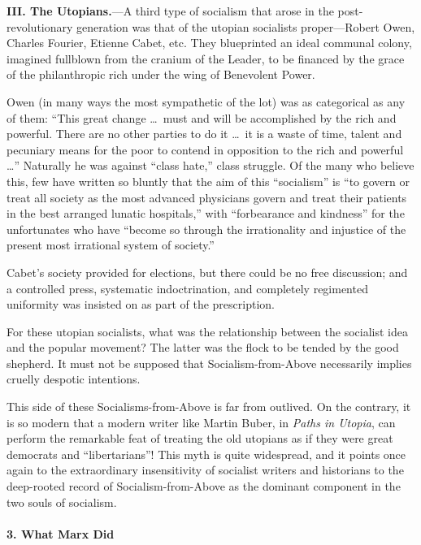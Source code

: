 \textbf{III. The Utopians.}---A third type of socialism that arose in the post-revolutionary generation was that of the utopian socialists proper---Robert Owen, Charles Fourier, Etienne Cabet, etc. They blueprinted an ideal communal colony, imagined fullblown from the cranium of the Leader, to be financed by the grace of the philanthropic rich under the wing of Benevolent Power.

Owen (in many ways the most sympathetic of the lot) was as categorical as any of them: ``This great change \ldots\ must and will be accomplished by the rich and powerful. There are no other parties to do it \ldots\ it is a waste of time, talent and pecuniary means for the poor to contend in opposition to the rich and powerful \ldots'' Naturally he was against ``class hate,'' class struggle. Of the many who believe this, few have written so bluntly that the aim of this ``socialism'' is ``to govern or treat all society as the most advanced physicians govern and treat their patients in the best arranged lunatic hospitals,'' with ``forbearance and kindness'' for the unfortunates who have ``become so through the irrationality and injustice of the present most irrational system of society.''

Cabet's society provided for elections, but there could be no free discussion; and a controlled press, systematic indoctrination, and completely regimented uniformity was insisted on as part of the prescription.

For these utopian socialists, what was the relationship between the socialist idea and the popular movement? The latter was the flock to be tended by the good shepherd. It must not be supposed that Socialism-from-Above necessarily implies cruelly despotic intentions.

This side of these Socialisms-from-Above is far from outlived. On the contrary, it is so modern that a modern writer like Martin Buber, in \emph{Paths in Utopia}, can perform the remarkable feat of treating the old utopians as if they were great democrats and ``libertarians''! This myth is quite widespread, and it points once again to the extraordinary insensitivity of socialist writers and historians to the deep-rooted record of Socialism-from-Above as the dominant component in the two souls of socialism.

\paragraph{3. What Marx Did}

